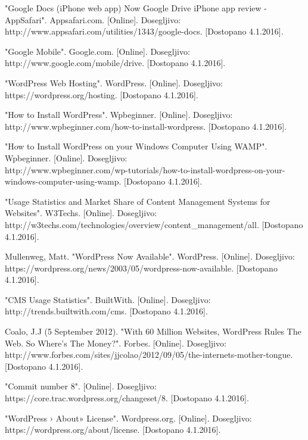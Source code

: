 \documentclass[a4paper, 12pt]{book}
\begin{document}
\begin{thebibliography}{99}
 "Google Docs (iPhone web app) Now Google Drive iPhone app review - AppSafari". Appsafari.com. 
[Online]. Dosegljivo:\\ http://www.appsafari.com/utilities/1343/google-docs.
[Dostopano 4.1.2016].

 "Google Mobile". Google.com. 
[Online]. Dosegljivo:\\ http://www.google.com/mobile/drive.
[Dostopano 4.1.2016].

 "WordPress Web Hosting". WordPress.
[Online]. Dosegljivo:\\ https://wordpress.org/hosting.
[Dostopano 4.1.2016].

 "How to Install WordPress". Wpbeginner. 
[Online]. Dosegljivo:\\ http://www.wpbeginner.com/how-to-install-wordpress.
[Dostopano 4.1.2016].

 "How to Install WordPress on your Windows Computer Using WAMP". Wpbeginner. 
[Online]. Dosegljivo:\\ http://www.wpbeginner.com/wp-tutorials/how-to-install-wordpress-on-your-windows-computer-using-wamp.
[Dostopano 4.1.2016].

 "Usage Statistics and Market Share of Content Management Systems for Websites". W3Techs.
[Online]. Dosegljivo:\\ http://w3techs.com/technologies/overview/content\_management/all.
[Dostopano 4.1.2016].

 Mullenweg, Matt. "WordPress Now Available". WordPress.
[Online]. Dosegljivo:\\ https://wordpress.org/news/2003/05/wordpress-now-available.
[Dostopano 4.1.2016].

 "CMS Usage Statistics". BuiltWith.
[Online]. Dosegljivo:\\ http://trends.builtwith.com/cms.
[Dostopano 4.1.2016].

 Coalo, J.J (5 September 2012). "With 60 Million Websites, WordPress Rules The Web. So Where's The Money?". Forbes. 
[Online]. Dosegljivo:\\ http://www.forbes.com/sites/jjcolao/2012/09/05/the-internets-mother-tongue.
[Dostopano 4.1.2016].

 "Commit number 8". 
[Online]. Dosegljivo:\\ https://core.trac.wordpress.org/changeset/8.
[Dostopano 4.1.2016].

 "WordPress › About» License". Wordpress.org.
[Online]. Dosegljivo:\\ https://wordpress.org/about/license.
[Dostopano 4.1.2016].


\end{thebibliography}
\end{document}

